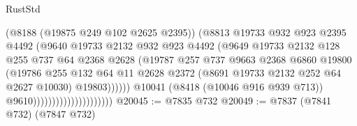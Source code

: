 \begin{lexlean}{RustStd}
\begin{coremodule}
                                                (@8188 (@19875 @249 @102 @2625 @2395))
                                                (@8813
                                                  @19733
                                                  @932
                                                  @923
                                                  @2395
                                                  @4492
                                                  (@9640
                                                    @19733
                                                    @2132
                                                    @932
                                                    @923
                                                    @4492
                                                    (@9649
                                                      @19733
                                                      @2132
                                                      @128
                                                      @255
                                                      @737
                                                      @64
                                                      @2368
                                                      @2628
                                                      (@19787
                                                        @257
                                                        @737
                                                        @9663
                                                        @2368
                                                        @6860
                                                        @19800
                                                        (@19786
                                                          @255
                                                          @132
                                                          @64
                                                          @11
                                                          @2628
                                                          @2372
                                                          (@8691 @19733 @2132 @252 @64 @2627 @10030)
                                                          @19803))))))
                                              @10041
                                              (@8418 (@10046 @916 @939 @713))
                                              @9610)))))))))))))))))))))
@20045 := @7835 @732
@20049 := @7837 (@7841 @732) (@7847 @732)

\end{coremodule}
\end{lexlean}
